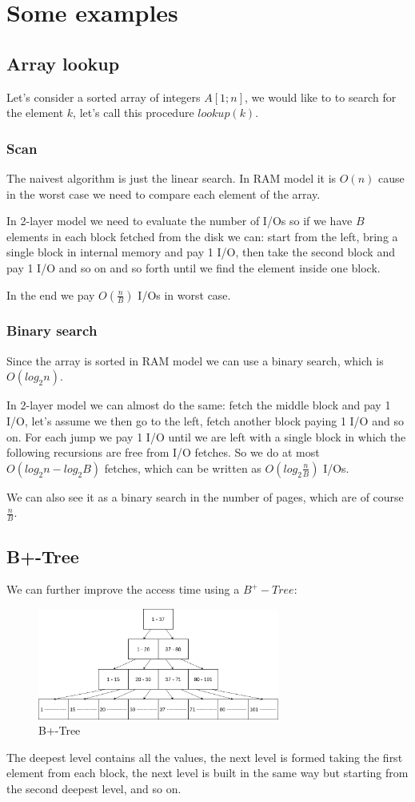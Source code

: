 \section{Some examples}
\subsection{Array lookup}
Let's consider a sorted array of integers $A[1 ; n]$, we would like to to search for the element $k$, let's call this procedure $lookup(k)$.

\subsubsection{Scan}
The naivest algorithm is just the linear search. In RAM model it is $O(n)$ cause in the worst case we need to compare each element of the array.

In 2-layer model we need to evaluate the number of I/Os so if we have $B$ elements in each block fetched from the disk we can: start from the left, bring a single block in internal memory and pay 1 I/O, then take the second block and pay 1 I/O and so on and so forth until we find the element inside one block.

In the end we pay $O(\frac{n}{B})$ I/Os in worst case.

\subsubsection{Binary search}
Since the array is sorted in RAM model we can use a binary search, which is $O(log_2 n)$.

In 2-layer model we can almost do the same: fetch the middle block and pay 1 I/O, let's assume we then go to the left, fetch another block paying 1 I/O and so on.
For each jump we pay 1 I/O until we are left with a single block in which the following recursions are free from I/O fetches.
So we do at most $O(log_2 n - log_2 B)$ fetches, which can be written as $O(log_2 \frac{n}{B})$ I/Os.

We can also see it as a binary search in the number of pages, which are of course $\frac{n}{B}$.


\subsection{B+-Tree}
We can further improve the access time using a $B^+-Tree$:
\begin{figure}
    \centering
    \includegraphics[width=300px]{images/1_Introduction/b+tree.png}
    \caption{B+-Tree}
\end{figure}
The deepest level contains all the values, the next level is formed taking the first element from each block, the next level is built in the same way but starting from the second deepest level, and so on.

